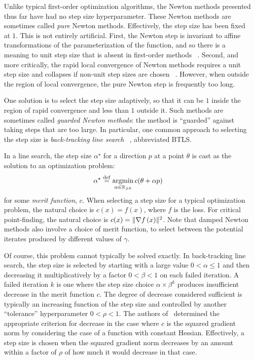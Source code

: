 \documentclass[../../thesis.tex]{subfiles}
\begin{document}
Unlike typical first-order optimization algorithms,
the Newton methods presented thus far have had no step size hyperparameter.
These Newton methods are sometimes called \emph{pure} Newton methods.
Effectively, the step size has been fixed at $1$.
This is not entirely artificial.
First, the Newton step is invariant to affine transformations
of the parameterization of the function,
and so there is a meaning to unit step size
that is absent in first-order methods%
~\cite[Section 9.5]{boyd2004}.
Second, and more critically,
the rapid local convergence of Newton methods
requires a unit step size
and collapses if non-unit step sizes are chosen%
~\cite[Theorems 11.2, 11.7, \& 11.10]{nocedal2006}.
However, when outside the region
of local convergence,
the pure Newton step is frequently too long.

One solution is to select the step size adaptively,
so that it can be $1$ inside the region of rapid convergence
and less than $1$ outside it.
Such methods are sometimes called \emph{guarded Newton methods}:
the method is \enquote{guarded} against taking steps that are too large.
In particular, one common approach to selecting the step size
is \emph{back-tracking line search}%
~\cite{armijo1966},
abbreviated BTLS.\@

In a line search, the step size $\alpha^\star{}$
for a direction $p$ at a point $\theta$
is cast as the solution to an optimization problem:
\begin{equation}
	\alpha^\star{}
	\stackrel{\small \mathrm{def}}{=} \mathop{\mathrm{argmin}}_{\alpha \in \mathbb{R}_{\geqslant 0}} c(\theta + \alpha p)
\end{equation}
\noindent for some \emph{merit function}, $c$.
When selecting a step size for a typical optimization problem,
the natural choice is $c(x) = f(x)$, where $f$ is the loss.
For critical point-finding,
the natural choice is $c(x) = \lVert\nabla f\left(x\right)\rVert^2$.
Note that damped Newton methods also involve a choice of merit function,
to select between the potential iterates
produced by different values of $\gamma$.

Of course, this problem cannot typically be solved exactly.
In back-tracking line search,
the step size is selected by starting with a large value
$0 < \alpha \leq 1$
and then decreasing it multiplicatively by a factor $0 < \beta < 1$
on each failed iteration.
A failed iteration $k$ is one where the step size choice
$\alpha \times \beta^k$
produces insufficient decrease in the merit function $c$.
The degree of decrease considered sufficient
is typically an increasing function of the step size
and controlled by another \enquote{tolerance} hyperparameter
$0 < \rho < 1$.
The authors of~\cite{roosta2018}
determined the appropriate criterion for decrease
in the case where $c$ is the squared gradient norm
by considering the case of a function with constant Hessian.
Effectively, a step size is chosen
when the squared gradient norm decreases by an amount within
a factor of $\rho$ of how much it would decrease
in that case.
\end{document}
